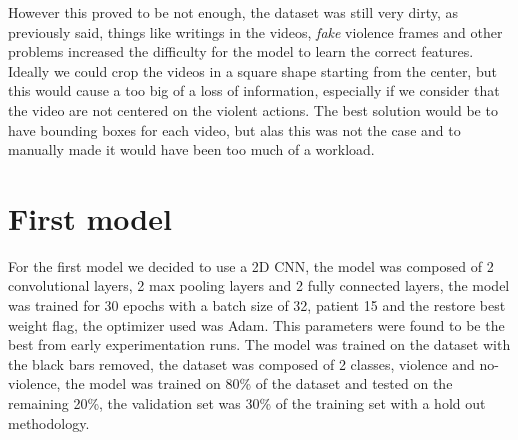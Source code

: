 However this proved to be not enough, the dataset was still very dirty, as previously said, things like writings in the videos, \textit{fake} violence frames and other problems increased the difficulty for the model to learn the correct features. Ideally we could crop the videos in a square shape starting from the center, but this would cause a too big of a loss of information, especially if we consider that the video are not centered on the violent actions. The best solution would be to have bounding boxes for each video, but alas this was not the case and to manually made it would have been too much of a workload.

\section{First model}
For the first model we decided to use a 2D CNN, the model was composed of 2 convolutional layers, 2 max pooling layers and 2 fully connected layers, the model was trained for 30 epochs with a batch size of 32, patient 15 and the restore best weight flag, the optimizer used was Adam. This parameters were found to be the best from early experimentation runs. The model was trained on the dataset with the black bars removed, the dataset was composed of 2 classes, violence and no-violence, the model was trained on 80\% of the dataset and tested on the remaining 20\%, the validation set was 30\% of the training set with a hold out methodology.  

